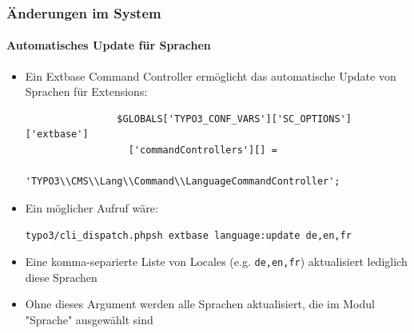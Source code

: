 
\begin{frame}[fragile]
	\frametitle{Änderungen im System}
	\framesubtitle{Automatisches Update für Sprachen}

	\begin{itemize}
		\item Ein Extbase Command Controller ermöglicht das automatische Update von Sprachen für Extensions:

			\begin{lstlisting}
				$GLOBALS['TYPO3_CONF_VARS']['SC_OPTIONS']['extbase']
				  ['commandControllers'][] =
				  'TYPO3\\CMS\\Lang\\Command\\LanguageCommandController';
			\end{lstlisting}

		\item Ein möglicher Aufruf wäre:

			\lstinline!typo3/cli_dispatch.phpsh extbase language:update de,en,fr!

		\item Eine komma-separierte Liste von Locales (e.g. \texttt{de,en,fr}) aktualisiert lediglich diese Sprachen
		\item Ohne dieses Argument werden alle Sprachen aktualisiert, die im Modul "Sprache" ausgewählt sind

	\end{itemize}

\end{frame}


